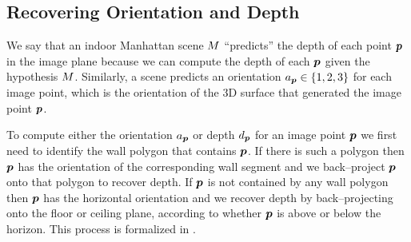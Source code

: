 \subsection{Recovering Orientation and Depth}
We say that an indoor Manhattan scene $\Scene$ ``predicts'' the depth
of each point $\Pixel$ in the image plane because we can compute the
depth of each $\Pixel$ given the hypothesis $\Scene$. Similarly, a
scene predicts an orientation $\Orient_{\Pixel}\in\SetOfOrients$ for
each image point, which is the orientation of the 3D surface that
generated the image point $\Pixel$.

To compute either the orientation $\Orient_{\Pixel}$ or depth
$\Depth_{\Pixel}$ for an image point $\Pixel$ we first need to identify
the wall polygon that contains $\Pixel$. If there is such a polygon then
$\Pixel$ has the orientation of the corresponding wall segment and we
back--project $\Pixel$ onto that polygon to recover depth. If $\Pixel$
is not contained by any wall polygon then $\Pixel$ has the horizontal
orientation and we recover depth by back--projecting onto the floor or
ceiling plane, according to whether $\Pixel$ is above or below the
horizon. This process is formalized in .

